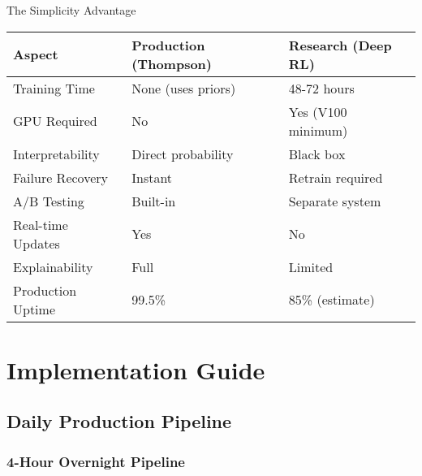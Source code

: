 \documentclass[11pt,a4paper]{report}
\begin{document}
\begin{techbox}{The Simplicity Advantage}
\begin{tabular}{|l|l|l|}
\hline
\rowcolor{aelpblue!20}
\textbf{Aspect} & \textbf{Production (Thompson)} & \textbf{Research (Deep RL)} \\
\hline
Training Time & None (uses priors) & 48-72 hours \\
GPU Required & No & Yes (V100 minimum) \\
Interpretability & Direct probability & Black box \\
Failure Recovery & Instant & Retrain required \\
A/B Testing & Built-in & Separate system \\
Real-time Updates & Yes & No \\
Explainability & Full & Limited \\
Production Uptime & 99.5\% & 85\% (estimate) \\
\hline
\end{tabular}
\end{techbox}

\chapter{Implementation Guide}

\section{Daily Production Pipeline}

\subsection{4-Hour Overnight Pipeline}
\end{document}
